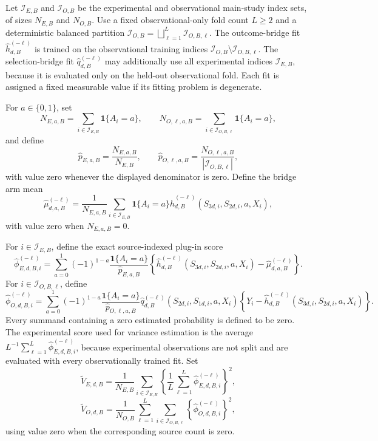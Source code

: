 Let \(\mathcal I_{E,B}\) and \(\mathcal I_{O,B}\) be the experimental and observational main-study index sets, of sizes \(N_{E,B}\) and \(N_{O,B}\). Use a fixed observational-only fold count \(L\ge2\) and a deterministic balanced partition \(\mathcal I_{O,B}=\bigsqcup_{\ell=1}^L\mathcal I_{O,B,\ell}\). The outcome-bridge fit \(\widehat h_{d,B}^{(-\ell)}\) is trained on the observational training indices \(\mathcal I_{O,B}\setminus\mathcal I_{O,B,\ell}\). The selection-bridge fit \(\widehat q_{d,B}^{(-\ell)}\) may additionally use all experimental indices \(\mathcal I_{E,B}\), because it is evaluated only on the held-out observational fold. Each fit is assigned a fixed measurable value if its fitting problem is degenerate.

For \(a\in\{0,1\}\), set
\[
 N_{E,a,B}=\sum_{i\in\mathcal I_{E,B}}\mathbf 1\{A_i=a\},
 \qquad
 N_{O,\ell,a,B}=\sum_{i\in\mathcal I_{O,B,\ell}}\mathbf 1\{A_i=a\},
\]
and define
\[
 \widehat p_{E,a,B}=\frac{N_{E,a,B}}{N_{E,B}},
 \qquad
 \widehat p_{O,\ell,a,B}
 =\frac{N_{O,\ell,a,B}}{|\mathcal I_{O,B,\ell}|},
\]
with value zero whenever the displayed denominator is zero. Define the bridge arm mean
\[
 \widehat\mu_{d,a,B}^{(-\ell)}
 =\frac{1}{N_{E,a,B}}
 \sum_{i\in\mathcal I_{E,B}}\mathbf 1\{A_i=a\}
 \widehat h_{d,B}^{(-\ell)}(S_{3d,i},S_{2d,i},a,X_i),
\]
with value zero when \(N_{E,a,B}=0\).

For \(i\in\mathcal I_{E,B}\), define the exact source-indexed plug-in score
\[
 \widehat\phi_{E,d,B,i}^{(-\ell)}
 =\sum_{a=0}^1(-1)^{1-a}
 \frac{\mathbf 1\{A_i=a\}}{\widehat p_{E,a,B}}
 \left\{\widehat h_{d,B}^{(-\ell)}(S_{3d,i},S_{2d,i},a,X_i)
 -\widehat\mu_{d,a,B}^{(-\ell)}\right\}.
\]
For \(i\in\mathcal I_{O,B,\ell}\), define
\[
 \widehat\phi_{O,d,B,i}^{(-\ell)}
 =\sum_{a=0}^1(-1)^{1-a}
 \frac{\mathbf 1\{A_i=a\}}{\widehat p_{O,\ell,a,B}}
 \widehat q_{d,B}^{(-\ell)}(S_{2d,i},S_{1d,i},a,X_i)
 \left\{Y_i-\widehat h_{d,B}^{(-\ell)}(S_{3d,i},S_{2d,i},a,X_i)\right\}.
\]
Every summand containing a zero estimated probability is defined to be zero. The experimental score used for variance estimation is the average \(L^{-1}\sum_{\ell=1}^L\widehat\phi_{E,d,B,i}^{(-\ell)}\), because experimental observations are not split and are evaluated with every observationally trained fit. Set
\[
 \widetilde V_{E,d,B}
 =\frac1{N_{E,B}}\sum_{i\in\mathcal I_{E,B}}
 \left\{\frac1L\sum_{\ell=1}^L
 \widehat\phi_{E,d,B,i}^{(-\ell)}\right\}^2,
\]
\[
 \widetilde V_{O,d,B}
 =\frac1{N_{O,B}}\sum_{\ell=1}^L
 \sum_{i\in\mathcal I_{O,B,\ell}}
 \left\{\widehat\phi_{O,d,B,i}^{(-\ell)}\right\}^2,
\]
using value zero when the corresponding source count is zero.

